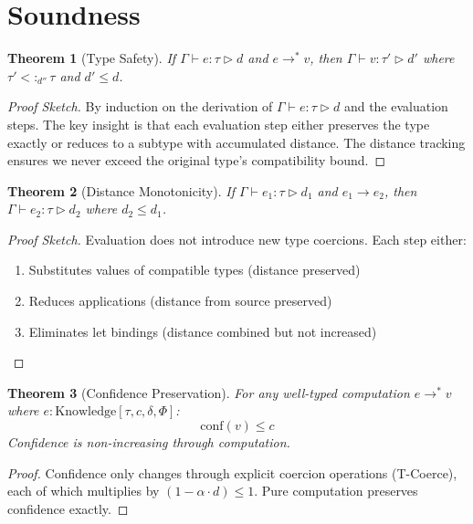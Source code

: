 \documentclass{article}
\newtheorem{theorem}{Theorem}[section]
\begin{document}
\section{Soundness}

\begin{theorem}[Type Safety]
If $\Gamma \vdash e : \tau \triangleright d$ and $e \to^* v$, then
$\Gamma \vdash v : \tau' \triangleright d'$ where $\tau' <:_{d''} \tau$
and $d' \leq d$.
\end{theorem}

\begin{proof}[Proof Sketch]
By induction on the derivation of $\Gamma \vdash e : \tau \triangleright d$
and the evaluation steps. The key insight is that each evaluation step
either preserves the type exactly or reduces to a subtype with accumulated
distance. The distance tracking ensures we never exceed the original
type's compatibility bound.
\end{proof}

\begin{theorem}[Distance Monotonicity]
If $\Gamma \vdash e_1 : \tau \triangleright d_1$ and $e_1 \to e_2$,
then $\Gamma \vdash e_2 : \tau \triangleright d_2$ where $d_2 \leq d_1$.
\end{theorem}

\begin{proof}[Proof Sketch]
Evaluation does not introduce new type coercions. Each step either:
\begin{enumerate}
\item Substitutes values of compatible types (distance preserved)
\item Reduces applications (distance from source preserved)
\item Eliminates let bindings (distance combined but not increased)
\end{enumerate}
\end{proof}

\begin{theorem}[Confidence Preservation]
For any well-typed computation $e \to^* v$ where $e : \text{Knowledge}[\tau, c, \delta, \Phi]$:
\[
\text{conf}(v) \leq c
\]
Confidence is non-increasing through computation.
\end{theorem}

\begin{proof}
Confidence only changes through explicit coercion operations (T-Coerce),
each of which multiplies by $(1 - \alpha \cdot d) \leq 1$. Pure computation
preserves confidence exactly.
\end{proof}
\end{document}
